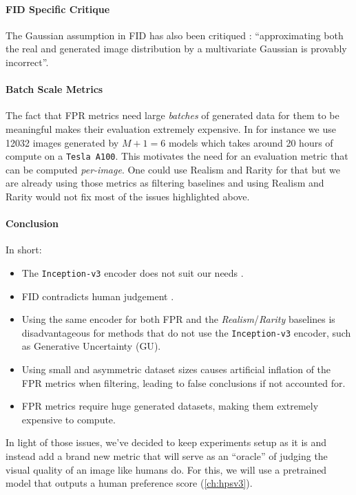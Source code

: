 \paragraph{FID Specific Critique}
The Gaussian assumption in \acs{FID} has also been critiqued \parencite{jayasumana_rethinking_2024}: ``approximating both the real and generated image distribution by a multivariate Gaussian is provably incorrect''.

\paragraph{Batch Scale Metrics}

The fact that \acs{FPR} metrics need large \textit{batches} of generated data for them to be meaningful makes their evaluation extremely expensive. In \cite{jazbec_generative_2025} for instance we use 12032 images generated by $M+1=6$ models which takes around 20 hours of compute on a \texttt{Tesla A100}. 
This motivates the need for an evaluation metric that can be computed \textit{per-image}. One could use Realism and Rarity for that but we are already using those metrics as filtering baselines and using Realism and Rarity would not fix most of the issues highlighted above.
 
 
\paragraph{Conclusion}

In short:
\begin{itemize}
    \item The \texttt{Inception-v3} encoder does not suit our needs \parencite{jayasumana_rethinking_2024}.
    \item \acs{FID} contradicts human judgement \parencite{jayasumana_rethinking_2024}.
    \item Using the same encoder for both \acs{FPR} and the \emph{Realism}/\emph{Rarity} baselines is disadvantageous for methods that do not use the \texttt{Inception-v3} encoder, such as Generative Uncertainty (\acs{GU}).
    \item Using small and asymmetric dataset sizes causes artificial inflation of the \acs{FPR} metrics when filtering, leading to false conclusions if not accounted for.
    \item \acs{FPR} metrics require huge generated datasets, making them extremely expensive to compute.
\end{itemize}

In light of those issues, we've decided to keep \cite{jazbec_generative_2025} experiments setup as it is and instead add a brand new metric that will serve as an ``oracle'' of judging the visual quality of an image like humans do. For this, we will use a pretrained model that outputs a human preference score (\autoref{ch:hpsv3}).

